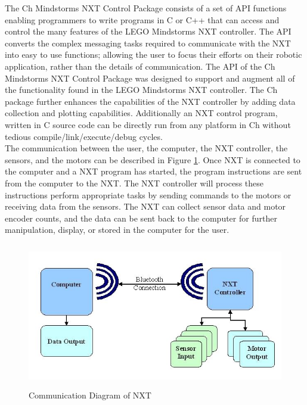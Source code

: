 \documentclass[11pt]{article}
\begin{document}
The Ch Mindstorms NXT Control Package consists of a set of API functions enabling programmers to 
write programs in C or C++ that can access and control the many features of the LEGO Mindstorms 
NXT controller. The API converts the complex messaging tasks required to communicate with the NXT 
into easy to use functions; allowing the user  to focus their efforts on their robotic application, 
rather than the details of communication. The API of the Ch Mindstorms NXT Control Package was 
designed to support and augment all of the functionality found in the LEGO Mindstorms NXT controller.
The Ch package further enhances the capabilities of the NXT controller by adding data collection and 
plotting capabilities. Additionally an NXT control program, written in C source code can be directly 
run from any platform in Ch without tedious compile/link/execute/debug cycles.\\

The communication between the user, the computer, the NXT controller, the sensors, and the motors can
be described in Figure \ref{fig_NXT_comm}. Once NXT is connected to the computer and a NXT program 
has started, the program instructions are sent from the computer to the NXT. The NXT controller will 
process these instructions perform appropriate tasks by sending commands to the motors or receiving 
data from the sensors. The NXT can collect sensor data and motor encoder counts, and the data can be 
sent back to the computer for further manipulation, display, or stored in the computer for the user.\\

\begin{figure}[h]
  \begin{center}
    \includegraphics[height=2.5in]{figure/mindstorm/NXT_connect.png}
    \caption{Communication Diagram of NXT\label{fig_NXT_comm}}
  \end{center}
\end{figure}
\end{document}
